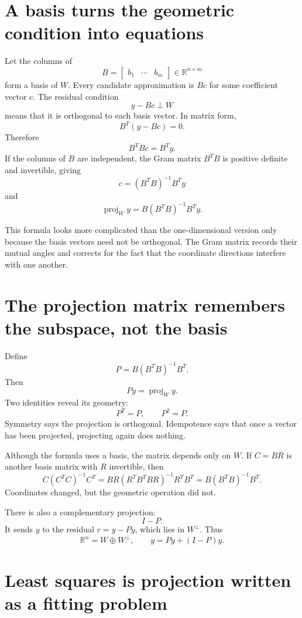 \section{A basis turns the geometric condition into equations}

Let the columns of
\[
  B=\begin{bmatrix}b_1&\cdots&b_m\end{bmatrix}
  \in\mathbb R^{n\times m}
\]
form a basis of \(W\).  Every candidate approximation is \(Bc\) for some coefficient vector \(c\).  The residual condition
\[
  y-Bc\perp W
\]
means that it is orthogonal to each basis vector.  In matrix form,
\[
  B^T(y-Bc)=0.
\]
Therefore
\[
  B^TBc=B^Ty.
\]
If the columns of \(B\) are independent, the Gram matrix \(B^TB\) is positive definite and invertible, giving
\[
  c=(B^TB)^{-1}B^Ty
\]
and
\[
  \boxed{
  \operatorname{proj}_W y
  =B(B^TB)^{-1}B^Ty.}
\]

This formula looks more complicated than the one-dimensional version only because the basis vectors need not be orthogonal.  The Gram matrix records their mutual angles and corrects for the fact that the coordinate directions interfere with one another.

\section{The projection matrix remembers the subspace, not the basis}

Define
\[
  P=B(B^TB)^{-1}B^T.
\]
Then
\[
  Py=\operatorname{proj}_W y.
\]
Two identities reveal its geometry:
\[
  P^T=P,
  \qquad
  P^2=P.
\]
Symmetry says the projection is orthogonal.  Idempotence says that once a vector has been projected, projecting again does nothing.

Although the formula uses a basis, the matrix depends only on \(W\).  If \(C=BR\) is another basis matrix with \(R\) invertible, then
\[
  C(C^TC)^{-1}C^T
  =BR(R^TB^TBR)^{-1}R^TB^T
  =B(B^TB)^{-1}B^T.
\]
Coordinates changed, but the geometric operation did not.

There is also a complementary projection:
\[
  I-P.
\]
It sends \(y\) to the residual \(r=y-Py\), which lies in \(W^\perp\).  Thus
\[
  \mathbb R^n=W\oplus W^\perp,
  \qquad
  y=Py+(I-P)y.
\]

\section{Least squares is projection written as a fitting problem}

